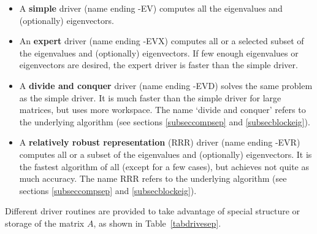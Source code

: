 \begin{itemize}

\item A {\bf simple} driver (name ending -EV) computes all the eigenvalues and
      (optionally) eigenvectors.

\item An {\bf expert} driver (name ending -EVX) computes all or a selected subset
      of the eigenvalues and (optionally) eigenvectors. If few enough
      eigenvalues or eigenvectors are desired, the expert driver is faster
      than the simple driver.

\item A {\bf divide and conquer} driver (name ending -EVD) solves the same problem
      as the simple driver.  It is much faster than the simple driver
      for large matrices, but uses more workspace. The name `divide and conquer'
      refers to the underlying algorithm (see sections \ref{subseccompsep}
      and \ref{subsecblockeig}).

\item A {\bf relatively robust representation} (RRR) driver (name ending -EVR) computes
      all or a subset of the eigenvalues and (optionally)
      eigenvectors. It is the fastest algorithm of all (except for a few cases),
      but achieves not quite as much accuracy. The name RRR refers to the underlying
      algorithm (see sections \ref{subseccompsep} and \ref{subsecblockeig}).

\end{itemize}

Different driver routines are provided to take advantage of special
structure or storage of the matrix $A$, as shown in
Table~\ref{tabdrivesep}.

